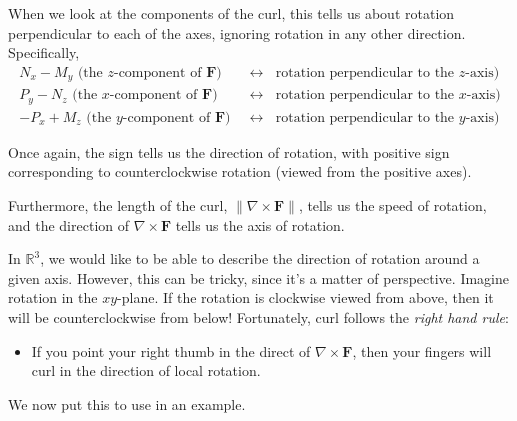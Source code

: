\documentclass{ximera}
\begin{document}
When we look at the components of the curl, this tells us about rotation perpendicular to each of the axes, ignoring rotation in any other direction. Specifically,
\begin{align*}
N_x-M_y\textrm{ (the $z$-component of $\mathbf{F}$)}\;&\longleftrightarrow\;\textrm{ rotation perpendicular to the $z$-axis)}\\
P_y-N_z\textrm{ (the $x$-component of $\mathbf{F}$)}\;&\longleftrightarrow\;\textrm{ rotation perpendicular to the $x$-axis)}\\
-P_x+M_z\textrm{ (the $y$-component of $\mathbf{F}$)}\;&\longleftrightarrow\;\textrm{ rotation perpendicular to the $y$-axis)}
\end{align*}

Once again, the sign tells us the direction of rotation, with positive sign corresponding to counterclockwise rotation (viewed from the positive axes).

Furthermore, the length of the curl, $\|\nabla\times\mathbf{F}\|$, tells us the speed of rotation, and the direction of $\nabla\times\mathbf{F}$ tells us the axis of rotation.

In $\mathbb{R}^3$, we would like to be able to describe the direction of rotation around a given axis. However, this can be tricky, since it's a matter of perspective. Imagine rotation in the $xy$-plane. If the rotation is clockwise viewed from above, then it will be counterclockwise from below! Fortunately, curl follows the \emph{right hand rule}:
\begin{itemize}
\item[] If you point your right thumb in the direct of $\nabla\times\mathbf{F}$, then your fingers will curl in the direction of local rotation.
\end{itemize}

We now put this to use in an example.
\end{document}
